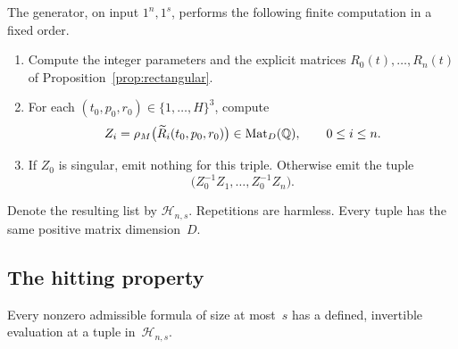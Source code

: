 The generator, on input $1^n,1^s$, performs the following finite
computation in a fixed order.
\begin{enumerate}
  \item Compute the integer parameters and the explicit matrices
    $R_0(t),\ldots,R_n(t)$ of
    Proposition~\ref{prop:rectangular}.
  \item For each $(t_0,p_0,r_0)\in\{1,\ldots,H\}^3$, compute
    \[
      Z_i=\rho_M\bigl(\widetilde R_i(t_0,p_0,r_0)\bigr)
      \in\operatorname{Mat}_D(\mathbb Q),\qquad 0\le i\le n.
    \]
  \item If $Z_0$ is singular, emit nothing for this triple. Otherwise
    emit the tuple
    \begin{equation}
      \bigl(Z_0^{-1}Z_1,\ldots,Z_0^{-1}Z_n\bigr).
      \label{eq:generator-output}
    \end{equation}
\end{enumerate}
Denote the resulting list by $\mathcal H_{n,s}$. Repetitions are
harmless. Every tuple has the same positive matrix dimension~$D$.

\subsection{The hitting property}

\begin{proposition}
\label{prop:generator-hitting}
Every nonzero admissible formula of size at most~$s$ has a defined,
invertible evaluation at a tuple in~$\mathcal H_{n,s}$.
\end{proposition}

